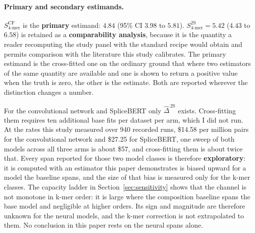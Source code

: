 \paragraph{Primary and secondary estimands.} $S^{\mathrm{CF}}_{4\text{-mer}}$ is the \textbf{primary} estimand:
$4.84$ (95\% CI $3.98$ to $5.81$). $S^{\mathrm{2S}}_{4\text{-mer}} = 5.42$ ($4.43$ to $6.58$) is
retained as a \textbf{comparability analysis}, because it is the quantity a reader
recomputing the study panel with the standard recipe would obtain and permits comparison with the
literature this study calibrates. The primary
estimand is the cross-fitted one on the ordinary ground that where two estimators of the same
quantity are available and one is shown to return a positive value when the truth is zero, the
other is the estimate. Both are reported wherever the distinction changes a number.

For the convolutional network and SpliceBERT only $\widehat{\Delta}^{\,\mathrm{2S}}$ exists.
Cross-fitting them requires ten additional base fits per dataset per arm, which I did not run.
At the rates this study measured over 940 recorded runs, \$14.58 per million pairs for the
convolutional network and \$27.25 for SpliceBERT, one sweep of both models across all three
arms is about \$57, and cross-fitting them is about twice that. Every span reported for those two model
classes is therefore \textbf{exploratory}: it is computed with an estimator this paper
demonstrates is biased upward for a model the baseline spans, and the size of that bias is
measured only for the k-mer classes. The capacity ladder in
Section~\ref{sec:sensitivity} shows that the channel is not monotone in k-mer order: it is large
where the composition baseline spans the base model and negligible at higher orders. Its sign
and magnitude are therefore unknown for the neural models, and the k-mer correction is not
extrapolated to them. No conclusion in this paper rests on the neural spans alone.

